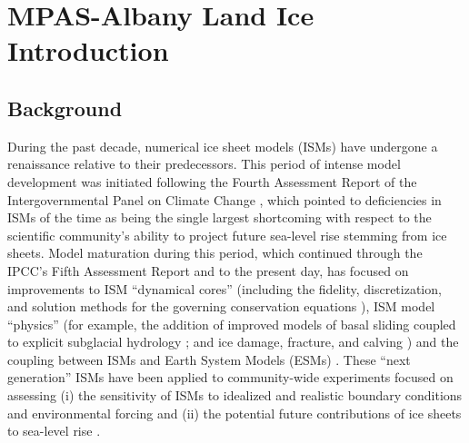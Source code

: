 \chapter{MPAS-Albany Land Ice Introduction}
\label{chap:landice-intro}

\section{Background}

During the past decade, numerical ice sheet models (ISMs) have undergone a renaissance relative to their predecessors. This period of intense model development was initiated following the Fourth Assessment Report of the Intergovernmental Panel on Climate Change \citep{IPCCWG1PhysicalSolomon2007}, which pointed to deficiencies in ISMs of the time as being the single largest shortcoming with respect to the scientific community's ability to project future sea-level rise stemming from ice sheets. 
Model maturation during this period, which continued through the IPCC's Fifth Assessment Report \citep{IPCCWG1PhysicalStocker2013} and to the present day, has focused on improvements to ISM ``dynamical cores'' (including the fidelity, discretization, and solution methods for the governing conservation equations \citep[e.g.,][]{Bueler2009,Schoof2010,Goldberg2011a,perego2012,Leng2012,Larour2012,Aschwanden2012,Cornford2013,gagliardini2013,brinkerhoff2013}), ISM model ``physics'' (for example, the addition of improved models of basal sliding coupled to explicit subglacial hydrology \citep[e.g.,][]{Schoof2005,Werder2013,Hewitt2013,Hoffman2014,Bueler2015}; and ice damage, fracture, and calving \citep[e.g.,][]{Astrom2014,Bassis2015,Borstad2016,Jimenez2017}) and the coupling between ISMs and Earth System Models (ESMs) \citep[e.g.,][]{Ridley2005,vizcaino2008,Vizcaino2009,Fyke2011,Lipscomb2013}. These ``next generation'' ISMs have been applied to community-wide experiments focused on assessing (i) the sensitivity of ISMs to idealized and realistic boundary conditions and environmental forcing and (ii) the potential future contributions of ice sheets to sea-level rise \citep[see e.g.,][]{pattyn2013,Nowicki2013a,Nowicki2013b,Bindschadler2013,Shannon2013,edwards2014}. 

